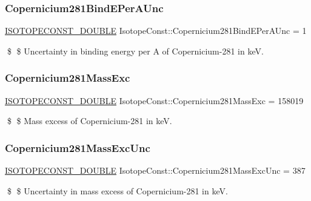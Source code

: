 \subsubsection{\texorpdfstring{Copernicium281\+Bind\+E\+Per\+A\+Unc}{Copernicium281BindEPerAUnc}}
{\footnotesize\ttfamily \mbox{\hyperlink{group___isotope_const-_macros_ga8f45a7272ce02c0b4c65c44636ed719a}{I\+S\+O\+T\+O\+P\+E\+C\+O\+N\+S\+T\+\_\+\+D\+O\+U\+B\+LE}} Isotope\+Const\+::\+Copernicium281\+Bind\+E\+Per\+A\+Unc = 1}

\$ \$ Uncertainty in binding energy per A of Copernicium-\/281 in keV. \mbox{\label{group___isotope_const-_copernicium-_cn281_ga6c116d4b14f4bb3bb8d9a4394120bd95}} 
\subsubsection{\texorpdfstring{Copernicium281\+Mass\+Exc}{Copernicium281MassExc}}
{\footnotesize\ttfamily \mbox{\hyperlink{group___isotope_const-_macros_ga8f45a7272ce02c0b4c65c44636ed719a}{I\+S\+O\+T\+O\+P\+E\+C\+O\+N\+S\+T\+\_\+\+D\+O\+U\+B\+LE}} Isotope\+Const\+::\+Copernicium281\+Mass\+Exc = 158019}

\$ \$ Mass excess of Copernicium-\/281 in keV. \mbox{\label{group___isotope_const-_copernicium-_cn281_gab76df2e7449f4015ea33e1d5ab23f7c6}} 
\subsubsection{\texorpdfstring{Copernicium281\+Mass\+Exc\+Unc}{Copernicium281MassExcUnc}}
{\footnotesize\ttfamily \mbox{\hyperlink{group___isotope_const-_macros_ga8f45a7272ce02c0b4c65c44636ed719a}{I\+S\+O\+T\+O\+P\+E\+C\+O\+N\+S\+T\+\_\+\+D\+O\+U\+B\+LE}} Isotope\+Const\+::\+Copernicium281\+Mass\+Exc\+Unc = 387}

\$ \$ Uncertainty in mass excess of Copernicium-\/281 in keV. \mbox{\label{group___isotope_const-_copernicium-_cn281_gac5c5f5c7b6e9c6b1fade309c47250498}} 
